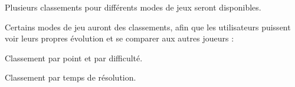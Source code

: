 {
    Plusieurs classements pour différents modes de jeux seront disponibles.
} {
    Certains modes de jeu auront des classements, afin que les utilisateurs puissent voir leurs propres évolution et se comparer aux autres joueurs :
    \noexpand\begin{description}
        \noexpand\item[Partie Classique :]
            Classement par point et par difficulté.
        \noexpand\item[SpeedRun :]
            Classement par temps de résolution.
    \noexpand\end{description}
}